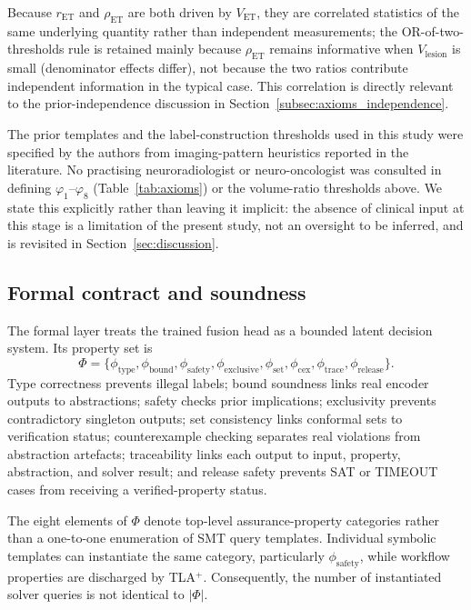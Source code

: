 \documentclass[preprint,11pt]{elsarticle}
\begin{document}
Because $r_{\mathrm{ET}}$ and $\rho_{\mathrm{ET}}$ are both driven by $V_{\mathrm{ET}}$, they are correlated statistics of the same underlying quantity rather than independent measurements; the OR-of-two-thresholds rule is retained mainly because $\rho_{\mathrm{ET}}$ remains informative when $V_{\mathrm{lesion}}$ is small (denominator effects differ), not because the two ratios contribute independent information in the typical case. This correlation is directly relevant to the prior-independence discussion in Section~\ref{subsec:axioms_independence}.

The prior templates and the label-construction thresholds used in this study were specified by the authors from imaging-pattern heuristics reported in the literature. No practising neuroradiologist or neuro-oncologist was consulted in defining $\varphi_1$--$\varphi_8$ (Table~\ref{tab:axioms}) or the volume-ratio thresholds above. We state this explicitly rather than leaving it implicit: the absence of clinical input at this stage is a limitation of the present study, not an oversight to be inferred, and is revisited in Section~\ref{sec:discussion}.

\subsection{Formal contract and soundness}
\label{subsec:formal_contract}

The formal layer treats the trained fusion head as a bounded latent decision system. Its property set is
\begin{equation}
\Phi=\{\phi_{\mathrm{type}},\phi_{\mathrm{bound}},\phi_{\mathrm{safety}},\phi_{\mathrm{exclusive}},\phi_{\mathrm{set}},\phi_{\mathrm{cex}},\phi_{\mathrm{trace}},\phi_{\mathrm{release}}\}.
\end{equation}
Type correctness prevents illegal labels; bound soundness links real encoder outputs to abstractions; safety checks prior implications; exclusivity prevents contradictory singleton outputs; set consistency links conformal sets to verification status; counterexample checking separates real violations from abstraction artefacts; traceability links each output to input, property, abstraction, and solver result; and release safety prevents SAT or TIMEOUT cases from receiving a verified-property status.

The eight elements of $\Phi$ denote top-level assurance-property categories rather than a one-to-one enumeration of SMT query templates. Individual symbolic templates can instantiate the same category, particularly $\phi_{\mathrm{safety}}$, while workflow properties are discharged by TLA$^{+}$. Consequently, the number of instantiated solver queries is not identical to $|\Phi|$.
\end{document}
